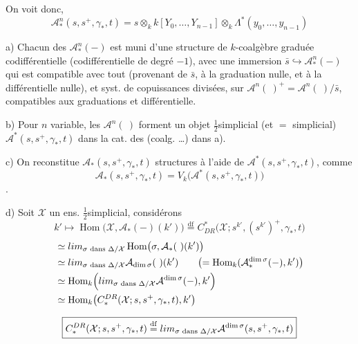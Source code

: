 \documentclass[11pt,a4paper]{article}
\begin{document}
On voit donc, \ill{} \ill{}
\[
  \mathcal{A}^{n}_{*}(s,s^+,\gamma_*,t)
  =s\otimes_k k[Y_0,\dots,Y_{n-1}]\otimes_k{\textstyle\Lambda^{*}}(y_0,\dots,y_{n-1})
\]

a) Chacun des $\mathcal{A}^n_*(-)$ est muni d'une structure de $k$-coalgèbre
 graduée codifférentielle (codifférentielle de degré $-1$),
avec une immersion $\bar s\hookrightarrow\mathcal{A}^n_*(-)$ qui est compatible avec
tout (provenant de $\bar s$, à la graduation nulle, et à la différentielle
nulle), et  syst. de copuissances divisées, sur
$\mathcal{A}^n(\ )^+=\mathcal{A}^n(\ )/\bar s$, compatibles aux graduations et
différentielle.

b) Pour $n$ variable, les $\mathcal{A}^n(\ )$ forment un objet
$\tfrac12$simplicial (et $=$ simplicial) $\mathcal{A}^*(s,s^+,\gamma_*,t)$
dans la cat. des (coalg. \ill{} …) 
 dans a).

c) On reconstitue $\mathcal{A}_*(s,s^+,\gamma_*,t)$  structures à
l'aide de $\mathcal{A}^*(s,s^+,\gamma_*,t)$, comme
\[
  \mathcal{A}_*(s,s^+,\gamma_*,t)=V_k\bigl(\mathcal{A}^*(s,s^+,\gamma_*,t)\bigr)
\]
.

d) Soit $\mathcal{X}$ un ens. $\tfrac12$simplicial, considérons
\[
  k'\longmapsto\operatorname{Hom}\bigl(\mathcal{X},\mathcal{A}_*(-)(k')\bigr)
  \overset{\mathrm{df}}{=}
  C^{*}_{DR}\bigl(\mathcal{X};s^{k'},(s^{k'})^+,\gamma_*,t\bigr)
\]
\begin{align*}
  &\simeq \varprojlim_{\sigma\text{ dans }\Delta/\mathcal{X}}
     \operatorname{Hom}\bigl(\sigma,\mathcal{A}_*(\ )(k')\bigr)\\
  &\simeq \varprojlim_{\sigma\text{ dans }\Delta/\mathcal{X}}
     \mathcal{A}_{\dim\sigma}(\ )(k')
     \qquad\bigl(=\operatorname{Hom}_k(\mathcal{A}^{\dim\sigma}_*(-),k')\bigr)\\
  &\simeq \operatorname{Hom}_k\Bigl(\varinjlim_{\sigma\text{ dans }\Delta/\mathcal{X}}
     \mathcal{A}^{\dim\sigma}(-),k'\Bigr)\\
  &\simeq \operatorname{Hom}_k\bigl(C^{DR}_*(\mathcal{X};s,s^+,\gamma_*,t),k'\bigr)
\end{align*}

\[
  \boxed{C^{DR}_*(\mathcal{X};s,s^+,\gamma_*,t)\overset{\mathrm{df}}{=}
  \varinjlim_{\sigma\text{ dans }\Delta/\mathcal{X}}
  \mathcal{A}^{\dim\sigma}(s,s^+,\gamma_*,t)}
\]
\end{document}
